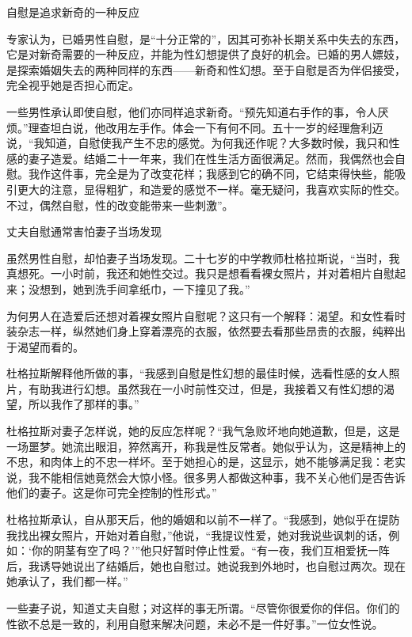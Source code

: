 \documentclass[12pt,UTF8]{ctexbook}
\begin{document}
自慰是追求新奇的一种反应


专家认为，已婚男性自慰，是“十分正常的”，因其可弥补长期关系中失去的东西，它是对新奇需要的一种反应，并能为性幻想提供了良好的机会。已婚的男人嫖妓，是探索婚姻失去的两种同样的东西——新奇和性幻想。至于自慰是否为伴侣接受，完全视乎她是否担心而定。

一些男性承认即使自慰，他们亦同样追求新奇。“预先知道右手作的事，令人厌烦。”理查坦白说，他改用左手作。体会一下有何不同。五十一岁的经理詹利迈说，“我知道，自慰使我产生不忠的感觉。为何我还作呢？大多数时候，我只和性感的妻子造爱。结婚二十一年来，我们在性生活方面很满足。然而，我偶然也会自慰。我作这件事，完全是为了改变花样；我感到它的确不同，它结束得快些，能吸引更大的注意，显得粗犷，和造爱的感觉不一样。毫无疑问，我喜欢实际的性交。不过，偶然自慰，性的改变能带来一些刺激”。





丈夫自慰通常害怕妻子当场发现


虽然男性自慰，却怕妻子当场发现。二十七岁的中学教师杜格拉斯说，“当时，我真想死。一小时前，我还和她性交过。我只是想看看裸女照片，并对着相片自慰起来；没想到，她到洗手间拿纸巾，一下撞见了我。”

为何男人在造爱后还想对着裸女照片自慰呢？这只有一个解释：渴望。和女性看时装杂志一样，纵然她们身上穿着漂亮的衣服，依然要去看那些昂贵的衣服，纯粹出于渴望而看的。

杜格拉斯解释他所做的事，“我感到自慰是性幻想的最佳时候，选看性感的女人照片，有助我进行幻想。虽然我在一小时前性交过，但是，我接着又有性幻想的渴望，所以我作了那样的事。”

杜格拉斯对妻子怎样说，她的反应怎样呢？“我气急败坏地向她道歉，但是，这是一场噩梦。她流出眼泪，猝然离开，称我是性反常者。她似乎认为，这是精神上的不忠，和肉体上的不忠一样坏。至于她担心的是，这显示，她不能够满足我：老实说，我不能相信她竟然会大惊小怪。很多男人都做这种事，我不关心他们是否告诉他们的妻子。这是你可完全控制的性形式。”

杜格拉斯承认，自从那天后，他的婚姻和以前不一样了。“我感到，她似乎在提防我找出裸女照片，开始对着自慰，”他说，“我提议性爱，她对我说些讽刺的话，例如：‘你的阴茎有空了吗？’”他只好暂时停止性爱。“有一夜，我们互相爱抚一阵后，我诱导她说出了结婚后，她也自慰过。她说我到外地时，也自慰过两次。现在她承认了，我们都一样。”

一些妻子说，知道丈夫自慰；对这样的事无所谓。“尽管你很爱你的伴侣。你们的性欲不总是一致的，利用自慰来解决问题，未必不是一件好事。”一位女性说。
\end{document}
